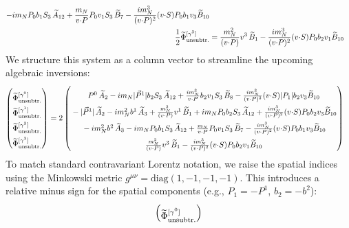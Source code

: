 \begin{widetext}
\begin{align}
		- i m_N  P_0 b_1 S_3\, \widetilde{A}_{12}+ \frac{m_N}{v {\cdot} P}  P_0 v_1 S_3\, \widetilde{B}_7- \frac{i m_N^3}{(v {\cdot} P)^2} (v {\cdot} S) P_0 b_1 v_3 \widetilde{B}_{10}\\
    \frac{1}{2}\widetilde \Phi^{[\gamma^3]}_{\text{unsubtr.}}& = \frac{m_N^2}{(v {\cdot} P)} v^3\, \widetilde{B}_1- \frac{i m_N^3}{(v {\cdot} P)^2} (v {\cdot} S)  P_0 b_2 v_1 \widetilde{B}_{10}
\end{align}
We structure this system as a column vector to streamline the upcoming algebraic inversions:
\begin{align}
    \begin{pmatrix}
        \rule{0pt}{16pt} \widetilde \Phi^{[\gamma^{0}]}_{\unsub}\\
        \rule{0pt}{16pt} \widetilde \Phi^{[\gamma^{1}]}_{\unsub}\\
        \rule{0pt}{16pt} \widetilde \Phi^{[\gamma^{2}]}_{\unsub}\\
        \rule{0pt}{16pt} \widetilde \Phi^{[\gamma^{3}]}_{\unsub}
    \end{pmatrix} &=2\begin{pmatrix}
       \rule{0pt}{16pt}  P^0\, \tAmp_2  - i \mN  |\vec{P}^1| \bvec_2 S_3\, \tAmp_{12}+ \frac{ i \mN^3}{v \tcdot P}  \bvec_2 v_1 S_3\, \tBmp_8- \frac{i \mN^3}{(v \tcdot P)^2} (v \tcdot S)  |P_1| \bvec_2 v_3 \tBmp_{10}\\
        \rule{0pt}{16pt} -|\vec{P}^1|\, \tAmp_2- i \mN^2 \bvec^1\, \tAmp_3+ \frac{\mN^2}{(v \tcdot P)} v^1\, \tBmp_1 
		+ i \mN  P_0 \bvec_2 S_3\, \tAmp_{12}+ \frac{i \mN^3}{(v \tcdot P)^2} (v \tcdot S)  P_0 \bvec_2 v_3 \tBmp_{10}\\
         \rule{0pt}{16pt} - i \mN^2 \bvec^2\, \tAmp_3
		- i \mN  P_0 \bvec_1 S_3\, \tAmp_{12}+ \frac{\mN}{v \tcdot P}  P_0 v_1 S_3\, \tBmp_7- \frac{i \mN^3}{(v \tcdot P)^2} (v \tcdot S) P_0 \bvec_1 v_3 \tBmp_{10}\\
        \rule{0pt}{16pt} \frac{\mN^2}{(v \tcdot P)} v^3\, \tBmp_1- \frac{i \mN^3}{(v \tcdot P)^2} (v \tcdot S)  P_0 \bvec_2 v_1 \tBmp_{10}
    \end{pmatrix}
\end{align}
To match standard contravariant Lorentz notation, we raise the spatial indices using the Minkowski metric $g^{\mu\nu} = \text{diag}(1, -1, -1, -1)$. This introduces a relative minus sign for the spatial components (e.g., $P_1 = -P^1$, $b_2 = -b^2$):
\begin{align}
    \begin{pmatrix}
        \rule{0pt}{16pt} \widetilde \Phi^{[\gamma^{0}]}_{\unsub}\\

\end{pmatrix}
\end{align}
\end{widetext}
